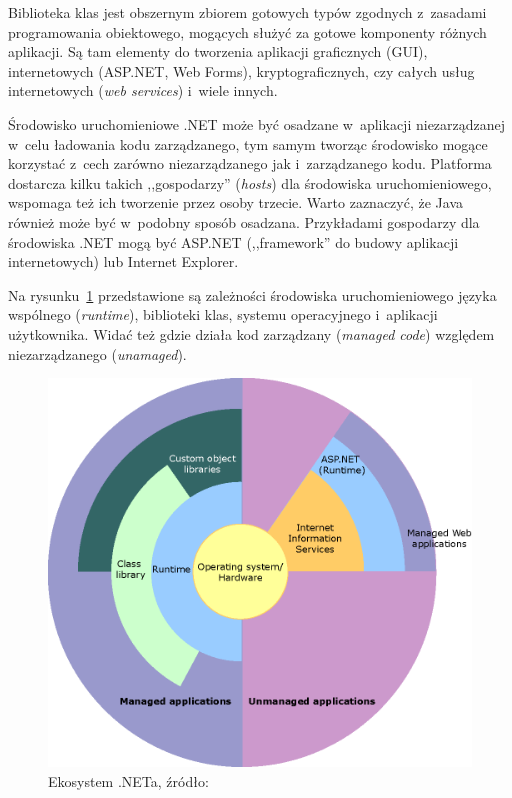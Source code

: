 Biblioteka klas jest obszernym zbiorem gotowych typów zgodnych z~zasadami programowania obiektowego, mogących służyć za gotowe komponenty różnych aplikacji. Są tam elementy do tworzenia aplikacji graficznych (GUI), internetowych (ASP.NET, Web Forms), kryptograficznych, czy całych usług internetowych (\emph{web services}) i~wiele innych.

Środowisko uruchomieniowe .NET może być osadzane w~aplikacji niezarządzanej w~celu ładowania kodu zarządzanego, tym samym tworząc środowisko mogące korzystać z~cech zarówno niezarządzanego jak i~zarządzanego kodu. Platforma dostarcza kilku takich ,,gospodarzy'' (\emph{hosts}) dla środowiska uruchomieniowego, wspomaga też ich tworzenie przez osoby trzecie.
Warto zaznaczyć, że Java również może być w~podobny sposób osadzana.
Przykładami gospodarzy dla środowiska .NET mogą być ASP.NET (,,framework'' do budowy aplikacji internetowych) lub Internet Explorer.

Na rysunku~\ref{fig:dotnet-ecosystem} przedstawione są zależności środowiska uruchomieniowego języka wspólnego (\emph{runtime}), biblioteki klas, systemu operacyjnego i~aplikacji użytkownika. Widać też gdzie działa kod zarządzany (\emph{managed code}) względem niezarządzanego (\emph{unamaged}).

\begin{figure}
	\centering
		\includegraphics[scale=0.6]{img/dotnet-ecosystem.png}
	\caption{Ekosystem .NETa, źródło: \cite{dot-net-overview}}
	\label{fig:dotnet-ecosystem}
\end{figure}

